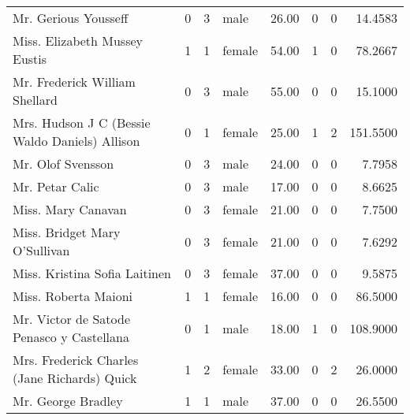 \begin{tabular}{lrrlrrrr}
Mr. Gerious Yousseff                               &         0 &       3 &    male &  26.00 &                        0 &                        0 &   14.4583 \\
Miss. Elizabeth Mussey Eustis                      &         1 &       1 &  female &  54.00 &                        1 &                        0 &   78.2667 \\
Mr. Frederick William Shellard                     &         0 &       3 &    male &  55.00 &                        0 &                        0 &   15.1000 \\
Mrs. Hudson J C (Bessie Waldo Daniels) Allison     &         0 &       1 &  female &  25.00 &                        1 &                        2 &  151.5500 \\
Mr. Olof Svensson                                  &         0 &       3 &    male &  24.00 &                        0 &                        0 &    7.7958 \\
Mr. Petar Calic                                    &         0 &       3 &    male &  17.00 &                        0 &                        0 &    8.6625 \\
Miss. Mary Canavan                                 &         0 &       3 &  female &  21.00 &                        0 &                        0 &    7.7500 \\
Miss. Bridget Mary O'Sullivan                      &         0 &       3 &  female &  21.00 &                        0 &                        0 &    7.6292 \\
Miss. Kristina Sofia Laitinen                      &         0 &       3 &  female &  37.00 &                        0 &                        0 &    9.5875 \\
Miss. Roberta Maioni                               &         1 &       1 &  female &  16.00 &                        0 &                        0 &   86.5000 \\
Mr. Victor de Satode Penasco y Castellana          &         0 &       1 &    male &  18.00 &                        1 &                        0 &  108.9000 \\
Mrs. Frederick Charles (Jane Richards) Quick       &         1 &       2 &  female &  33.00 &                        0 &                        2 &   26.0000 \\
Mr. George Bradley                                 &         1 &       1 &    male &  37.00 &                        0 &                        0 &   26.5500 \\

\end{tabular}
